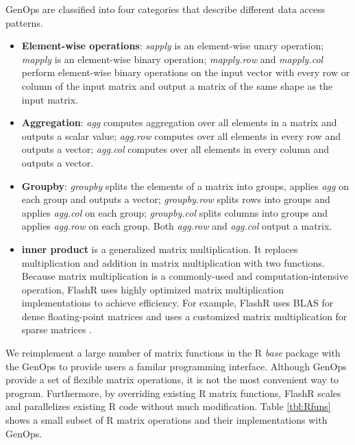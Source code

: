 GenOps are classified into four categories that describe different data access
patterns.
\begin{itemize}
	\item \textbf{Element-wise operations}:
		\textit{sapply} is an element-wise unary operation; \textit{mapply}
		is an element-wise binary operation; \textit{mapply.row} and
		\textit{mapply.col} perform element-wise binary operations on
		the input vector with every row or column of the input matrix
		and output a matrix of the same shape as the input matrix.
	\item \textbf{Aggregation}: \textit{agg} computes aggregation over
		all elements in a matrix and outputs a scalar value; \textit{agg.row}
		computes over all elements in every row and outputs a vector;
		\textit{agg.col} computes over all elements in every column and
		outputs a vector.
	\item \textbf{Groupby}: \textit{groupby} splits the elements of a matrix
		into groups, applies \textit{agg} on each group and outputs a vector;
		\textit{groupby.row} splits rows into groups and applies \textit{agg.col}
		on each group; \textit{groupby.col} splits columns into groups and applies
		\textit{agg.row} on each group. Both \textit{agg.row} and \textit{agg.col}
		output a matrix.
	\item \textbf{inner product} is a generalized matrix multiplication.
		It replaces multiplication and addition in matrix multiplication with
		two functions. Because matrix multiplication is a commonly-used and
		computation-intensive operation, FlashR uses highly optimized matrix
		multiplication implementations to achieve efficiency. For example,
		FlashR uses BLAS for dense floating-point matrices and uses a customized
		matrix multiplication for sparse matrices \cite{SEM_SpMM}.
\end{itemize}

We reimplement a large number of matrix functions in the R \textit{base}
package with the GenOps to provide users a familar programming interface.
Although GenOps provide a set of flexible matrix operations, it is not
the most convenient way to program. Furthermore, by overriding
existing R matrix functions, FlashR scales and parallelizes existing R code
without much modification.
Table \ref{tbl:Rfuns} shows a small subset of R matrix operations and
their implementations with GenOps.

